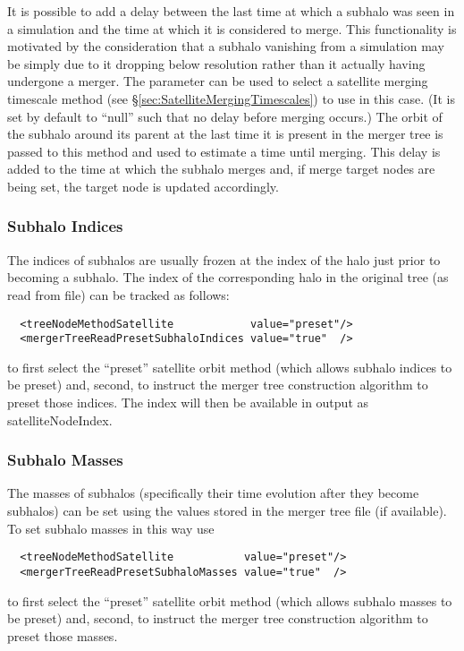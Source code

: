 It is possible to add a delay between the last time at which a subhalo was seen in a simulation and the time at which it is considered to merge. This functionality is motivated by the consideration that a subhalo vanishing from a simulation may be simply due to it dropping below resolution rather than it actually having undergone a merger. The parameter {\normalfont \ttfamily [mergerTreeReadSubresolutionMergingMethod]} can be used to select a satellite merging timescale method (see \S\ref{sec:SatelliteMergingTimescales}) to use in this case. (It is set by default to ``{\normalfont \ttfamily null}'' such that no delay before merging occurs.) The orbit of the subhalo around its parent at the last time it is present in the merger tree is passed to this method and used to estimate a time until merging. This delay is added to the time at which the subhalo merges and, if merge target nodes are being set, the target node is updated accordingly.

\subsubsection{Subhalo Indices}

The indices of subhalos are usually frozen at the index of the halo just prior to becoming a subhalo. The index of the corresponding halo in the original tree (as read from file) can be tracked as follows:
\begin{verbatim}
  <treeNodeMethodSatellite            value="preset"/>
  <mergerTreeReadPresetSubhaloIndices value="true"  />
\end{verbatim}
to first select the ``preset'' satellite orbit method (which allows subhalo indices to be preset) and, second, to instruct the merger tree construction algorithm to preset those indices. The index will then be available in output as {\normalfont \ttfamily satelliteNodeIndex}.

\subsubsection{Subhalo Masses}

The masses of subhalos (specifically their time evolution after they become subhalos) can be set using the values stored in the merger tree file (if available). To set subhalo masses in this way use
\begin{verbatim}
  <treeNodeMethodSatellite           value="preset"/>
  <mergerTreeReadPresetSubhaloMasses value="true"  />
\end{verbatim}
to first select the ``preset'' satellite orbit method (which allows subhalo masses to be preset) and, second, to instruct the merger tree construction algorithm to preset those masses.

